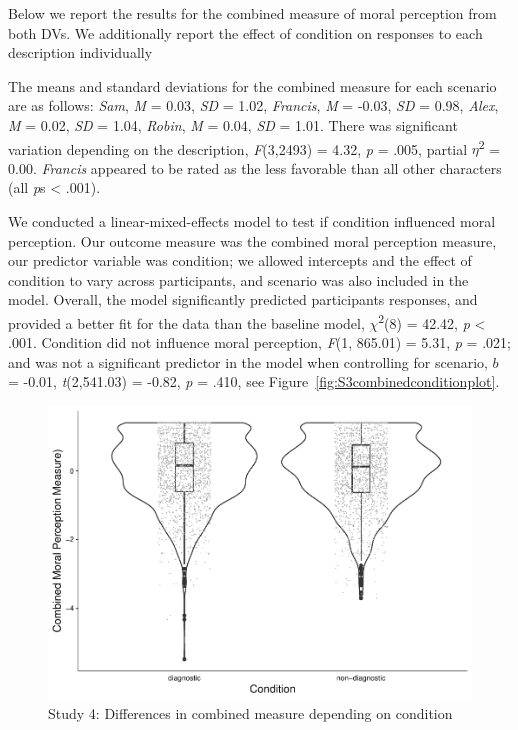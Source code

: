 \documentclass[
  american,
  man,floatsintext]{apa7}
\begin{document}
Below we report the results for the combined measure of moral perception from both DVs. We additionally report the effect of condition on responses to each description individually

The means and standard deviations for the combined measure for each scenario are as follows:
\emph{Sam},
\emph{M} = 0.03, \emph{SD} = 1.02,
\emph{Francis},
\emph{M} = -0.03, \emph{SD} = 0.98,
\emph{Alex},
\emph{M} = 0.02, \emph{SD} = 1.04,
\emph{Robin},
\emph{M} = 0.04, \emph{SD} = 1.01. There was significant variation depending on the description, \emph{F}(3,2493) = 4.32, \emph{p} = .005, partial \(\eta\)\textsuperscript{2} = 0.00. \emph{Francis} appeared to be rated as the less favorable than all other characters (all \emph{p}s \textless{} .001).

We conducted a linear-mixed-effects model to test if condition influenced moral perception. Our outcome measure was the combined moral perception measure, our predictor variable was condition; we allowed intercepts and the effect of condition to vary across participants, and scenario was also included in the model.
Overall, the model significantly predicted participants responses, and provided a better fit for the data than the baseline model, \(\chi\)\textsuperscript{2}(8) = 42.42, \emph{p} \textless{} .001. Condition did not influence moral perception, \emph{F}(1, 865.01) = 5.31, \emph{p} = .021; and was not a significant predictor in the model when controlling for scenario, \(b\) = -0.01, \emph{t}(2,541.03) = -0.82, \emph{p} = .410, see Figure~\ref{fig:S3combinedconditionplot}.

\begin{figure}[!h]
\includegraphics[width=\textwidth,]{Supplementary_files/figure-latex/S4combinedconditionplot-1} \caption{Study 4: Differences in combined measure depending on condition}\label{fig:S4combinedconditionplot}
\end{figure}
\end{document}
